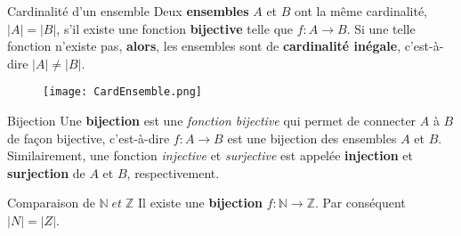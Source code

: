 \documentclass[16pt]{report}
\begin{document}
\begin{multicols*}{2}
            \begin{Definitionx}{Cardinalité d'un ensemble}{}
                Deux \textbf{ensembles} $A$ et $B$ ont la même cardinalité, $|A| = |B|$, s'il existe une fonction 
                \textbf{bijective} telle que $f : A \rightarrow  B$. Si une telle fonction n'existe pas, 
                \textbf{alors}, les ensembles sont de \textbf{cardinalité inégale}, c'est-à-dire 
                $|A| \neq |B|$. 
            \end{Definitionx}


            \begin{figure}[H]
                \begin{center}
                    \texttt{[image: CardEnsemble.png]}
                \end{center}
            \end{figure}


            \begin{Definitionx}{Bijection}{}
                Une \textbf{bijection} est une \textit{fonction bijective} qui permet de connecter $A$ à $B$ 
                de façon bijective, c'est-à-dire $f : A \rightarrow  B$ est une bijection des 
                ensembles $A$ et $B$. Similairement, une fonction \textit{injective} et \textit{surjective}
                est appelée \textbf{injection} et \textbf{surjection} de $A$ et $B$, respectivement.     
            \end{Definitionx}


            \begin{Theorem}{Comparaison de $\mathbb{N} \; et \; \mathbb{Z}$}{}
                Il existe une \textbf{bijection} $f : \mathbb{N} \rightarrow  \mathbb{Z}$. Par conséquent 
                $|N| = |Z|$. 
            \end{Theorem} 




\end{multicols*}
\end{document}
